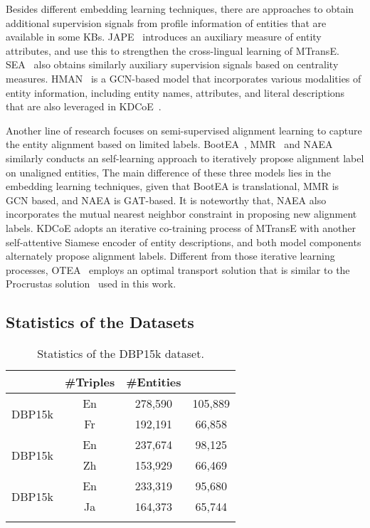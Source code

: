 \documentclass[11pt,a4paper]{article}
\def\bhline{\specialrule{.2em}{0em}{0em}}
\begin{document}
Besides different embedding learning techniques, there are approaches to obtain additional supervision signals from profile information of entities that are available in some KBs.
JAPE~\cite{sun2017cross} introduces an auxiliary measure of entity attributes, and use this to strengthen the cross-lingual learning of MTransE.
SEA~\cite{pei2019deg} also obtains similarly auxiliary supervision signals based on centrality measures.
HMAN~\cite{yang2019aligning} is a GCN-based model that incorporates various modalities of entity information, including entity names, attributes, and literal descriptions that are also leveraged in KDCoE~\cite{chen2018co}.


Another line of research focuses on semi-supervised alignment learning to capture the entity alignment based on limited labels.
BootEA~\cite{sun2018bootstrapping}, MMR~\cite{shi2019modeling} and NAEA~\cite{zhu2019neighborhood} similarly conducts an self-learning approach to iteratively propose alignment label on unaligned entities,
The main difference of these three models lies in the embedding learning techniques, given that BootEA is translational, MMR is GCN based, and NAEA is GAT-based.
It is noteworthy that, NAEA also incorporates the mutual nearest neighbor constraint in proposing new alignment labels.
KDCoE adopts an iterative co-training process of MTransE with another self-attentive Siamese encoder of entity descriptions,
and both model components alternately propose alignment labels.
Different from those iterative learning processes, OTEA~\cite{pei2019transport} employs an optimal transport solution that is similar to the Procrustas solution~\cite{schonemann1966procrustes} used in this work.



\subsection{Statistics of the Datasets}\label{sup:stats}


{
\begin{table}[h!]
\setlength\tabcolsep{2pt}
\centering
\scriptsize
\begin{tabular}{c|c|cc}
\bhline
\multicolumn{2}{c|}{Data}&\#Triples&\#Entities\\
\hline
\multirow{2}{*}{DBP15k}&En&278,590&105,889\\
&Fr&192,191&66,858\\
\hline
\multirow{2}{*}{DBP15k}&En&237,674&98,125\\
&Zh&153,929&66,469\\
\hline
\multirow{2}{*}{DBP15k}&En&233,319&95,680\\
&Ja&164,373&65,744\\
\bhline
\end{tabular}
\caption{Statistics of the DBP15k dataset.}\label{tbl:statdbp}
\end{table}
}
\end{document}

